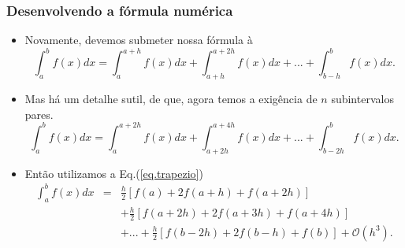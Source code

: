 \documentclass[xcolor=table]{beamer}
\newenvironment{stepitemize}{\begin{itemize}[<+->]}{\end{itemize} }
\begin{document}
\begin{frame}%

\frametitle{Desenvolvendo a f\'{o}rmula num\'{e}rica}

\begin{stepitemize}
\item Novamente, devemos submeter nossa f\'{o}rmula \`{a}%
\[
\int_{a}^{b}f\left( x\right) dx=\int_{a}^{a+h}f\left( x\right)
dx+\int_{a+h}^{a+2h}f\left( x\right) dx+...+\int_{b-h}^{b}f\left( x\right)
dx. 
\]

\item Mas h\'{a} um detalhe sutil, de que, agora temos a exig\^{e}ncia de $n$
subintervalos pares.%
\[
\int_{a}^{b}f\left( x\right) dx=\int_{a}^{a+2h}f\left( x\right)
dx+\int_{a+2h}^{a+4h}f\left( x\right) dx+...+\int_{b-2h}^{b}f\left( x\right)
dx.
\]

\item Ent\~{a}o utilizamos a Eq.(\ref{eq.trapezio})%
\begin{eqnarray*}
\int_{a}^{b}f\left( x\right) dx &=&\frac{h}{2}\left[ f\left( a\right)
+2f\left( a+h\right) +f\left( a+2h\right) \right] \\
&&+\frac{h}{2}\left[ f\left( a+2h\right) +2f\left( a+3h\right) +f\left(
a+4h\right) \right] \\
&&+...+\frac{h}{2}\left[ f\left( b-2h\right) +2f\left( b-h\right) +f\left(
b\right) \right] +\mathcal{O}\left( h^{3}\right) .
\end{eqnarray*}
\end{stepitemize}

\transboxout%
\end{frame}%
\end{document}
